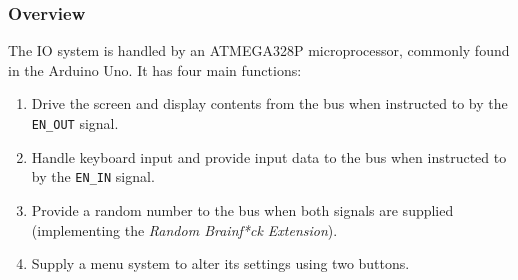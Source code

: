 \subsubsection{Overview}
The IO system is handled by an ATMEGA328P microprocessor, commonly found in the Arduino Uno. It has four main functions:
\begin{enumerate}
\item Drive the screen and display contents from the bus when instructed to by the \texttt{EN\_OUT} signal.
\item Handle keyboard input and provide input data to the bus when instructed to by the \texttt{EN\_IN} signal.
\item Provide a random number to the bus when both signals are supplied (implementing the \emph{Random Brainf*ck Extension}).
\item Supply a menu system to alter its settings using two buttons.
\end{enumerate}

